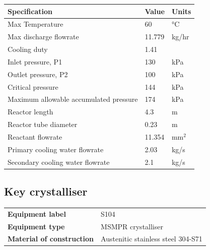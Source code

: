 \begin{table}[H]
\centering
\begin{tabular}{@{}l|l|l@{}}
\toprule
\textbf{Specification}                    & \textbf{Value} & \textbf{Units} \\ \midrule
Max Temperature                           & 60             & °C             \\ \midrule
Max discharge   flowrate                  & 11.779         & kg/hr          \\ \midrule
Cooling duty                              & 1.41           &                \\ \midrule
Inlet   pressure, P1                      & 130        & kPa            \\ \midrule
Outlet   pressure, P2                     & 100            & kPa            \\ \midrule
Critical   pressure                       & 144        & kPa            \\ \midrule
Maximum   allowable accumulated  pressure & 174        & kPa            \\ \midrule
Reactor length                            & 4.3          & m               \\ \midrule
Reactor tube diameter                            & 0.23          & m               \\ \midrule
Reactant flowrate                         & 11.354         & mm$^2$            \\ \midrule
Primary cooling water flowrate            & 2.03           & kg/s             \\ \midrule
Secondary cooling water flowrate          & 2.1         & kg/s            \\ \bottomrule
\end{tabular}
\end{table}
\newpage

\subsection{Key crystalliser}

\begin{table}[H]
    \centering
    \begin{tabular}{@{}l|l@{}}
    \toprule
      \textbf{Equipment label}  & S104\\
       \textbf{Equipment type}  & MSMPR crystalliser \\
       \textbf{Material of construction} & Austenitic stainless steel 304-S71 \\
       \bottomrule
    \end{tabular}
\end{table}


